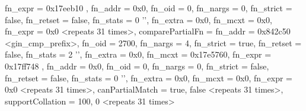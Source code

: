 \documentclass[11pt]{article}
\begin{document}
\begin{itemize}
\begin{textcode}
{{{      fn_expr = 0x17eeb10
    }, {
      fn_addr = 0x0,
      fn_oid = 0,
      fn_nargs = 0,
      fn_strict = false,
      fn_retset = false,
      fn_stats = 0 '',
      fn_extra = 0x0,
      fn_mcxt = 0x0,
      fn_expr = 0x0
    } <repeats 31 times>},
  comparePartialFn = {{
      fn_addr = 0x842c50 <gin_cmp_prefix>,
      fn_oid = 2700,
      fn_nargs = 4,
      fn_strict = true,
      fn_retset = false,
      fn_stats = 2 '',
      fn_extra = 0x0,
      fn_mcxt = 0x17e5760,
      fn_expr = 0x17ff748
    }, {
      fn_addr = 0x0,
      fn_oid = 0,
      fn_nargs = 0,
      fn_strict = false,
      fn_retset = false,
      fn_stats = 0 '',
      fn_extra = 0x0,
      fn_mcxt = 0x0,
      fn_expr = 0x0
    } <repeats 31 times>},
  canPartialMatch = {true, false <repeats 31 times>},
  supportCollation = {100, 0 <repeats 31 times>}
}
\end{textcode}
\end{itemize}
\end{document}
